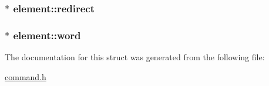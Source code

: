 \subsubsection[{\texorpdfstring{redirect}{redirect}}]{$\ast$ element\+::redirect}\hypertarget{structelement_ad3f13da7e9bdbe54746af382c8b6d9e5}{}\label{structelement_ad3f13da7e9bdbe54746af382c8b6d9e5}
\subsubsection[{\texorpdfstring{word}{word}}]{$\ast$ element\+::word}\hypertarget{structelement_a74c8c3c3cf92b8287e450fab71ed2074}{}\label{structelement_a74c8c3c3cf92b8287e450fab71ed2074}


The documentation for this struct was generated from the following file\+:\begin{DoxyCompactItemize}
\item 
\hyperlink{command_8h}{command.\+h}\end{DoxyCompactItemize}
